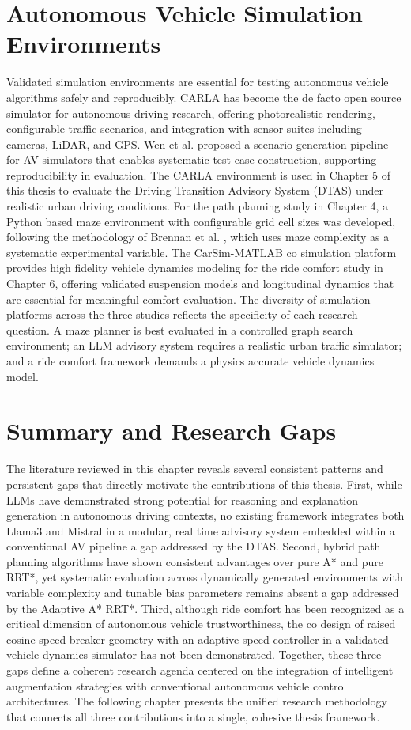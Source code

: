 \documentclass[a4paper,12pt,one side]{report}
\theoremstyle{definition}
\begin{document}
\begin{itemize}
\section{Autonomous Vehicle Simulation Environments}
Validated simulation environments are essential for testing autonomous vehicle algorithms safely and reproducibly. CARLA \cite{dosovitskiy2017carla} has become the de facto open source simulator for autonomous driving research, offering photorealistic rendering, configurable traffic scenarios, and integration with sensor suites including cameras, LiDAR, and GPS. Wen et al. \cite{wen2020scenario} proposed a scenario generation pipeline for AV simulators that enables systematic test case construction, supporting reproducibility in evaluation. The CARLA environment is used in Chapter 5 of this thesis to evaluate the Driving Transition Advisory System (DTAS) under realistic urban driving conditions.
For the path planning study in Chapter 4, a Python based maze environment with configurable grid cell sizes was developed, following the methodology of Brennan et al. \cite{brennan2024comparative}, which uses maze complexity as a systematic experimental variable. The CarSim-MATLAB co simulation platform provides high fidelity vehicle dynamics modeling for the ride comfort study in Chapter 6, offering validated suspension models and longitudinal dynamics that are essential for meaningful comfort evaluation.
The diversity of simulation platforms across the three studies reflects the specificity of each research question. A maze planner is best evaluated in a controlled graph search environment; an LLM advisory system requires a realistic urban traffic simulator; and a ride comfort framework demands a physics accurate vehicle dynamics model. 
\section{Summary and Research Gaps}
The literature reviewed in this chapter reveals several consistent patterns and persistent gaps that directly motivate the contributions of this thesis. First, while LLMs have demonstrated strong potential for reasoning and explanation generation in autonomous driving contexts, no existing framework integrates both Llama3 and Mistral in a modular, real time advisory system embedded within a conventional AV pipeline a gap addressed by the DTAS. Second, hybrid path planning algorithms have shown consistent advantages over pure A* and pure RRT*, yet systematic evaluation across dynamically generated environments with variable complexity and tunable bias parameters remains absent a gap addressed by the Adaptive A* RRT*. Third, although ride comfort has been recognized as a critical dimension of autonomous vehicle trustworthiness, the co design of raised cosine speed breaker geometry with an adaptive speed controller in a validated vehicle dynamics simulator has not been demonstrated.
Together, these three gaps define a coherent research agenda centered on the integration of intelligent augmentation strategies with conventional autonomous vehicle control architectures. The following chapter presents the unified research methodology that connects all three contributions into a single, cohesive thesis framework.
\newpage

\end{itemize}
\end{document}
